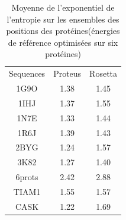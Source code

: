     \clearpage

    \begin{table}[!htbp]
      \centering

      \begin{tabular}{ccc}

        \toprule
        Sequences & Proteus & Rosetta \\
        \cmidrule{1-3}
        1G9O  & 1.38  & 1.45 \\
        1IHJ  & 1.37  & 1.55 \\
        1N7E  & 1.33  & 1.44 \\
        1R6J  & 1.39  & 1.43 \\
        2BYG  & 1.24  & 1.57 \\
        3K82  & 1.27  & 1.40 \\
        6prots & 2.42  & 2.88 \\
        TIAM1  & 1.55  & 1.57 \\
        CASK   & 1.22  & 1.69 \\

        \bottomrule

      \end{tabular}      
      \caption{Moyenne de l'exponentiel de l'entropie sur les ensembles des positions des protéines(énergies de référence optimisées sur six protéines)}
\label{tab:Entropie_PDZ}      
    \end{table}



